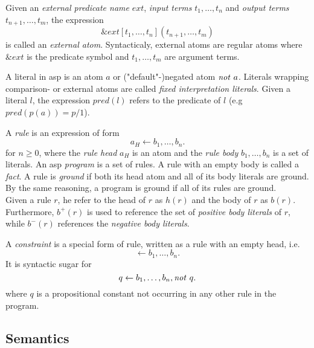 \begin{definition}
\label{def:prelims-asp-syntax-ext-atom}
Given an \emph{external predicate name} $\mathit{ext}$, \emph{input terms} $t_1,\ldots,t_n$ and \emph{output terms} $t_{n+1},\ldots,t_m$, the expression
\[
	\&\mathit{ext}[t_1,\ldots,t_n](t_{n+1},\ldots,t_m)
\]
is called an \emph{external atom}. Syntacticaly, external atoms are regular atoms where $\&\mathit{ext}$ is the predicate symbol and $t_1,\ldots,t_m$ are argument terms.
\end{definition}

\begin{definition}[Literal]
\label{def:prelims-asp-syntax-literal}
A literal in \gls{asp} is an atom $a$ or ("default"-)negated atom $\mathit{not}\ a$. Literals wrapping comparison- or external atoms are called \emph{fixed interpretation literals}. Given a literal $l$, the expression $pred(l)$ refers to the predicate of $l$ (e.g $pred(p(a)) = p/1$).
\end{definition}

\begin{definition}
\label{def:prelims-asp-syntax-rule}
A \emph{rule} is an expression of form
\[
	a_H \leftarrow b_1,\ldots,b_n.
\]
for $n \geq 0$, where the \emph{rule head} $a_H$ is an atom and the \emph{rule body} $b_1,\ldots,b_n$ is a set of literals. An \gls{asp} \emph{program} is a set of rules. A rule with an empty body is called a \emph{fact}. A rule is \emph{ground} if both its head atom and all of its body literals are ground. By the same reasoning, a program is ground if all of its rules are ground.\\
Given a rule $r$, he refer to the head of $r$ as $h(r)$ and the body of $r$ as $b(r)$. Furthermore, $b^+(r)$ is used to reference the set of \emph{positive body literals} of $r$, while $b^-(r)$ references the \emph{negative body literals}. 
\end{definition}

\begin{definition}[Constraint]
\label{def:prelims-asp-syntax-constraint}
A \emph{constraint} is a special form of rule, written as a rule with an empty head, i.e.
\[
	\leftarrow b_1,\ldots,b_n.
\]
It is syntactic sugar for
\[
	q \leftarrow b_1,\ldots,b_n, \mathit{not}\ q.
\]
where $q$ is a propositional constant not occurring in any other rule in the program.
\end{definition}

\subsection{Semantics}
\label{subsec:prelims-asp-semantics}

